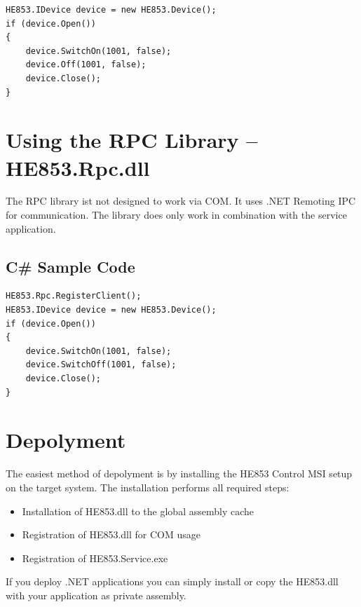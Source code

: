 \documentclass[
a4paper,
oneside,
halfparskip*,
normalheadings,
]
{scrbook}
\begin{document}
\begin{verbatim}
HE853.IDevice device = new HE853.Device();
if (device.Open())
{
    device.SwitchOn(1001, false);
    device.Off(1001, false);
    device.Close();
}
\end{verbatim}

\section{Using the RPC Library -- HE853.Rpc.dll}

The RPC library ist not designed to work via COM. It uses .NET Remoting IPC for
communication. The library does only work in combination with the service
application.

\subsection{C\# Sample Code}

\begin{verbatim}
HE853.Rpc.RegisterClient();
HE853.IDevice device = new HE853.Device();
if (device.Open())
{
    device.SwitchOn(1001, false);
    device.SwitchOff(1001, false);
    device.Close();
}
\end{verbatim}

\section{Depolyment}
The easiest method of depolyment is by installing the HE853 Control MSI setup on the target
system. The installation performs all required steps:

\begin{itemize}
  \item Installation of HE853.dll to the global assembly cache
	\item Registration of HE853.dll for COM usage
	\item Registration of HE853.Service.exe
\end{itemize}

If you deploy .NET applications you can simply install or copy the HE853.dll with your application
as private assembly.
\end{document}
